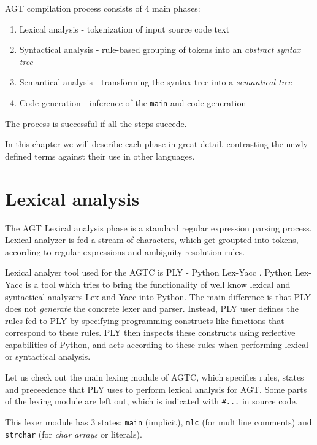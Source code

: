 \documentclass[times, utf8, diplomski]{fer}
\theoremstyle{definition}
\newcommand{\pythoncode}[3]{
    
}
\begin{document}
AGT compilation process consists of 4 main phases: 

\begin{enumerate}
\item Lexical analysis - tokenization of input source code text
\item Syntactical analysis - rule-based grouping of tokens into an \textit{abstract syntax tree}
\item Semantical analysis - transforming the syntax tree into a \textit{semantical tree}
\item Code generation - inference of the \texttt{main} and code generation
\end{enumerate}

The process is successful if all the steps suceede.

In this chapter we will describe each phase in great detail, contrasting the
newly defined terms against their use in other languages.

\section{Lexical analysis}

The AGT Lexical analysis phase is a standard regular expression parsing process.
Lexical analyzer is fed a stream of characters, which get groupted into tokens,
according to regular expressions and ambiguity resolution rules.

Lexical analyer tool used for the AGTC is PLY - Python Lex-Yacc \citep{c_ply_beazley}.
Python Lex-Yacc is a tool which tries to bring the functionality of well know
lexical and syntactical analyzers Lex and Yacc into Python. The main difference
is that PLY does not \textit{generate} the 
concrete lexer and parser. Instead, PLY user defines the rules fed to PLY by
specifying programming 
constructs like functions that correspond to these rules. PLY then inspects these constructs using 
reflective capabilities of Python, and acts according to these rules
when performing lexical or syntactical analysis.

Let us check out the main lexing module of AGTC, which specifies rules, states and preceedence that
PLY uses to perform lexical analysis for AGT. Some parts of the lexing module
are left out, which is indicated with \texttt{\#...} in source code.

\pythoncode{\resdir/compiler/lexer.py}{}{heyy}

This lexer module has 3 states: \texttt{main} (implicit), \texttt{mlc} (for multiline comments) 
and \texttt{strchar} (for \textit{char arrays} or  literals).
\end{document}
